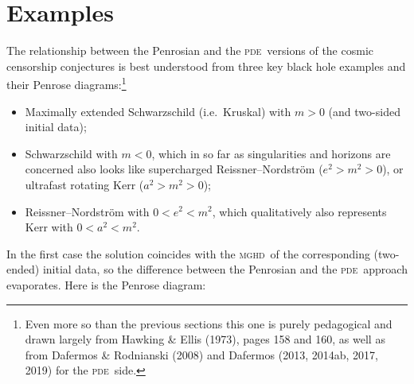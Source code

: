 \documentclass[11pt,a4paper]{article}
\newcommand{\mghd}{\textsc{mghd}}
\newcommand{\pde}{\textsc{pde}}
\begin{document}
 \section{Examples}\label{examples}
The relationship between the Penrosian and the \pde\ versions of the cosmic censorship conjectures is best understood from  three key black hole examples and their Penrose diagrams:\footnote{Even more so than the previous sections this one is purely pedagogical and drawn largely from  Hawking \& Ellis (1973), pages 158 and 160, as well as from Dafermos \& Rodnianski (2008) and Dafermos (2013, 2014ab, 2017, 2019) for the \pde\ side.}
\begin{itemize}
\item  Maximally extended Schwarz\-schild  (i.e.\ Kruskal) with $m>0$ (and two-sided initial data);
\item  Schwarz\-schild  with  $m<0$, which in so far as singularities and horizons are concerned also looks like supercharged Reissner--Nordstr\"{o}m  ($e^2>m^2>0$), or ultrafast rotating Kerr ($a^2>m^2>0$);
\item  Reissner--Nordstr\"{o}m with $0<e^2<m^2$, which  qualitatively also represents Kerr with $0<a^2<m^2$.
\end{itemize}
In the first case the  solution coincides with the \mghd\ of the corresponding (two-ended) initial data, so  the difference between the Penrosian and the \pde\ approach evaporates. Here is the Penrose diagram:
\end{document}
